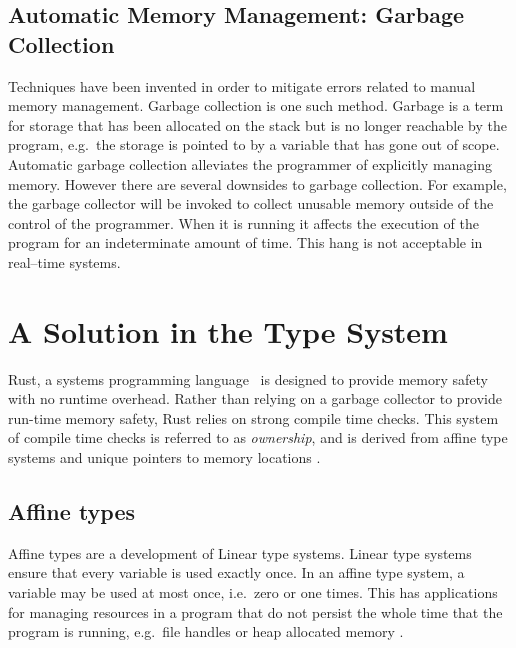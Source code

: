 

\subsection{Automatic Memory Management: Garbage Collection}
Techniques have been invented in order to mitigate errors related to manual
memory management. Garbage collection is one such method.  Garbage is a term
for storage that has been allocated on the stack but is no longer reachable by
the program, e.g.\ the storage is pointed to by a variable that has gone out of
scope. Automatic garbage collection alleviates the programmer of explicitly
managing memory. However there are several downsides to garbage collection. For
example, the garbage collector will be invoked to collect unusable memory
outside of the control of the programmer. When it is running it affects the
execution of the program for an indeterminate amount of time. This hang is not
acceptable in real--time systems.

\section{A Solution in the Type System}
Rust, a systems programming language~\cite{rust} is designed to provide memory
safety with no runtime overhead. Rather than relying on a garbage collector to
provide run-time memory safety, Rust relies on strong compile time checks.
This system of compile time checks is referred to as \textit{ownership}, and is
derived from affine type systems and unique pointers to memory
locations\cite{rust-borrowing} \cite{levy2015ownership}.

\subsection{Affine types}
Affine types are a development of Linear type systems. Linear type systems
ensure that every variable is used exactly once. In an affine type system, a
variable may be used at most once, i.e.\ zero or one times. This has applications
for managing resources in a program that do not persist the whole time that the
program is running, e.g.\ file handles or heap allocated memory \cite{attapl}
\cite{tovAffine}.

